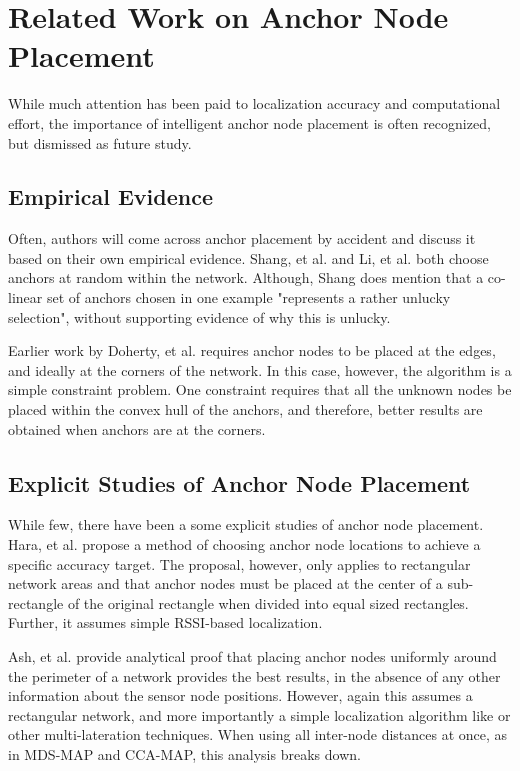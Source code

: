 \chapter{Related Work on Anchor Node Placement}
\label{chap:RelatedWork}
While much attention has been paid to localization accuracy and computational effort, the importance of intelligent anchor node placement is often recognized, but dismissed as future study.

\section{Empirical Evidence}
\label{sec:RelatedWorkEmpirical}
Often, authors will come across anchor placement by accident and discuss it based on their own empirical evidence.  Shang, et al.\cite[p. 964]{MDS-MAP} and Li, et al.\cite[p. 11]{CCA-MAP07} both choose anchors at random within the network.  Although, Shang does mention that a co-linear set of anchors chosen in one example "represents a rather unlucky selection", without supporting evidence of why this is unlucky.

Earlier work by Doherty, et al.\cite{Doherty} requires anchor nodes to be placed at the edges, and ideally at the corners of the network.  In this case, however, the algorithm is a simple constraint problem.  One constraint requires that all the unknown nodes be placed within the convex hull of the anchors, and therefore, better results are obtained when anchors are at the corners.

\section{Explicit Studies of Anchor Node Placement}
While few, there have been a some explicit studies of anchor node placement.  Hara, et al.\cite{Hara} propose a method of choosing anchor node locations to achieve a specific accuracy target.  The proposal, however, only applies to rectangular network areas and that anchor nodes must be placed at the center of a sub-rectangle of the original rectangle when divided into equal sized rectangles.  Further, it assumes simple RSSI-based localization.  

Ash, et al.\cite{Ash} provide analytical proof that placing anchor nodes uniformly around the perimeter of a network provides the best results, in the absence of any other information about the sensor node positions. However, again this assumes a rectangular network, and more importantly a simple localization algorithm like \cite{Doherty} or other multi-lateration techniques.  When using all inter-node distances at once, as in MDS-MAP and CCA-MAP, this analysis breaks down.

